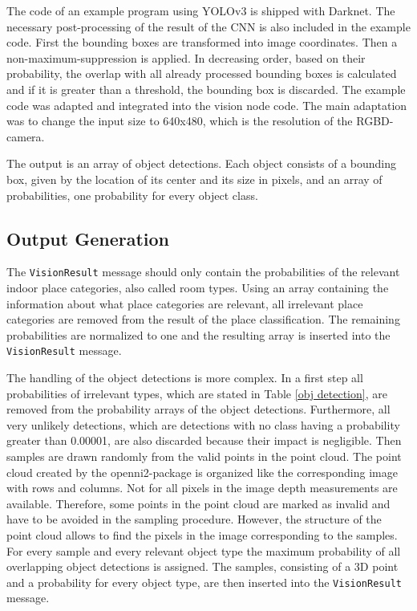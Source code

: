The code of an example program using YOLOv3 is shipped with Darknet. The necessary post-processing of the result of the CNN is also included in the example code. First the bounding boxes are transformed into image coordinates. Then a non-maximum-suppression is applied. In decreasing order, based on their probability, the overlap with all already processed bounding boxes is calculated and if it is greater than a threshold, the bounding box is discarded. The example code was adapted and integrated into the vision node code. The main adaptation was to change the input size to 640x480, which is the resolution of the RGBD-camera. 

The output is an array of object detections. Each object consists of a bounding box, given by the location of its center and its size in pixels, and an array of probabilities, one probability for every object class. 

\subsection{Output Generation}

The \texttt{VisionResult} message should only contain the probabilities of the relevant indoor place categories, also called room types. Using an array containing the information about what place categories are relevant, all irrelevant place categories are removed from the result of the place classification. The remaining probabilities are normalized to one and the resulting array is inserted into the \texttt{VisionResult} message.

The handling of the object detections is more complex. In a first step all probabilities of irrelevant types, which are stated in Table \ref{obj detection}, are removed from the probability arrays of the object detections. Furthermore, all very unlikely detections, which are detections with no class having a probability greater than 0.00001, are also discarded because their impact is negligible. Then samples are drawn randomly from the valid points in the point cloud. The point cloud created by the openni2-package is organized like the corresponding image with rows and columns. Not for all pixels in the image depth measurements are available. Therefore, some points in the point cloud are marked as invalid and have to be avoided in the sampling procedure. However, the structure of the point cloud allows to find the pixels in the image corresponding to the samples. For every sample and every relevant object type the maximum probability of all overlapping object detections is assigned. The samples, consisting of a 3D point and a probability for every object type, are then inserted into the \texttt{VisionResult} message.

